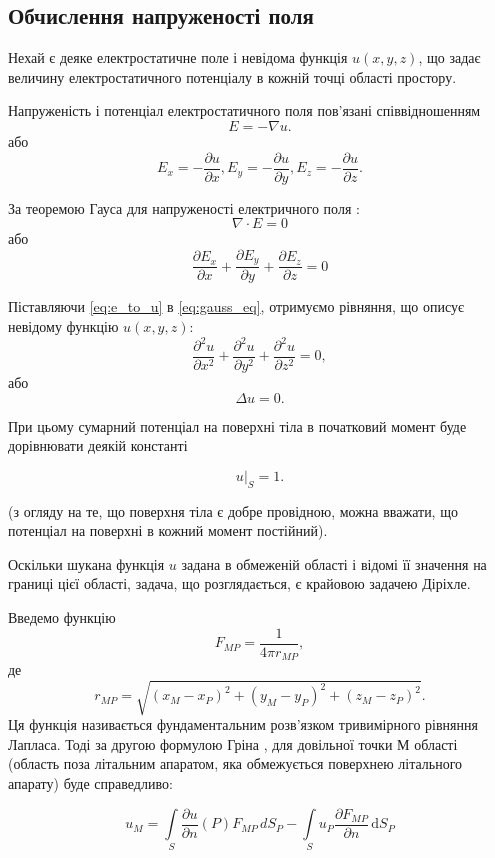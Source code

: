 \documentclass[a4paper,12pt]{article}
\begin{document}
\subsection{Обчислення напруженості поля}

Нехай є деяке електростатичне поле і невідома функція $u(x,y,z)$, що задає величину електростатичного потенціалу в кожній точці області простору.

Напруженість і потенціал електростатичного поля пов’язані співвідношенням
\[
E = -\nabla u.
\]
або
\begin{equation} \label{eq:e_to_u}
E_x = -\frac{\partial u}{\partial x}, E_y = -\frac{\partial u}{\partial y}, E_z = -\frac{\partial u}{\partial z}.
\end{equation}

За теоремою Гауса для напруженості електричного поля \cite{magnet}:
\[
\nabla \cdot E = 0
\]
або
\begin{equation} \label{eq:gauss_eq}
\frac{\partial E_x}{\partial x} + \frac{\partial E_y}{\partial y} + \frac{\partial E_z}{\partial z} = 0
\end{equation}

Піставляючи \ref{eq:e_to_u} в \ref{eq:gauss_eq}, отримуємо рівняння, що описує невідому функцію $u(x,y,z)$:
\[
\frac{\partial ^2 u}{\partial x^2} + \frac{\partial ^2 u}{\partial y^2} + \frac{\partial ^2 u}{\partial z^2} = 0,
\] або
\[
\Delta u = 0.
\]

При цьому сумарний потенціал на поверхні тіла в початковий момент буде дорівнювати деякій константі

\[
\left.u\right|_S = 1.
\]

(з огляду на те, що поверхня тіла є добре провідною, можна вважати, що потенціал на поверхні в кожний момент постійний).

Оскільки шукана функція $u$ задана в обмеженій області і відомі її значення на границі цієї області, задача, що розглядається, є крайовою задачею Діріхле.

Введемо функцію \[F_{MP} = \frac{1}{4\pi r_{MP}},\] де \[r_{MP} = \sqrt{(x_M - x_P)^2 + (y_M - y_P)^2 + (z_M - z_P)^2}.\]
Ця функція називається фундаментальним розв’язком тривимірного рівняння Лапласа. Тоді за другою формулою Гріна \cite{ilina}, для довільної точки М області (область поза літальним апаратом, яка обмежується поверхнею літального апарату) буде справедливо:

\[
u_M = \int\limits_S \frac{\partial u}{\partial n}(P) F_{MP} \, d S_P - \int\limits_S u_P \frac{\partial F_{MP}}{\partial n} \, \mathrm{d}S_P
\]
\end{document}
